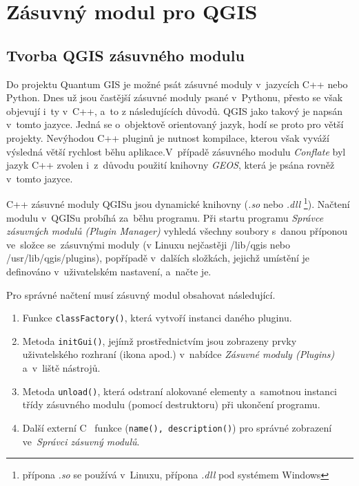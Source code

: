 \chapter{Zásuvný modul pro QGIS}
\label{6-plugin}

\section{Tvorba QGIS zásuvného modulu}
\label{plugin-tvorba}

Do projektu Quantum GIS je možné psát zásuvné moduly v~jazycích C++ nebo Python.
Dnes už jsou častější zásuvné moduly psané v~Pythonu, přesto se však objevují
i~ty v~C++, a~to z následujících důvodů. QGIS jako takový je napsán v~tomto 
jazyce. Jedná se o~objektově orientovaný jazyk, hodí se proto pro větší projekty. 
Nevýhodou C++ pluginů je nutnost kompilace, kterou však vyváží výsledná větší 
rychlost běhu aplikace.V~případě zásuvného modulu \textit{Conflate} byl jazyk 
C++ zvolen i~z~důvodu použití knihovny \textit{GEOS}, která je psána rovněž 
v~tomto jazyce.


C++ zásuvné moduly QGISu jsou dynamické knihovny (\textit{.so} nebo 
\textit{.dll} \footnote{ přípona \textit{.so} se používá v~Linuxu, přípona 
\textit{.dll} pod systémem Windows}). Načtení modulu v~QGISu probíhá za~běhu 
programu. Při startu programu \textit{Správce zásuvných modulů 
(Plugin Manager)} vyhledá všechny soubory s~danou příponou ve~složce 
se~zásuvnými moduly (v Linuxu nejčastěji /lib/qgis nebo 
/usr/lib/qgis/plugins), popřípadě v~dalších složkách, jejichž umístění
je definováno v~uživatelském nastavení, a~načte je.

Pro správné načtení musí zásuvný modul obsahovat následující.

\begin{enumerate}
 \item Funkce \texttt{classFactory()}, která vytvoří instanci daného pluginu.
 \item Metoda \texttt{initGui()}, jejímž prostřednictvím jsou zobrazeny prvky 
	uživatelského rozhraní (ikona apod.) v~nabídce \textit{Zásuvné moduly 
	(Plugins)} a~v~liště nástrojů.
 \item Metoda \texttt{unload()}, která odstraní alokované elementy a~samotnou
	instanci třídy zásuvného modulu (pomocí destruktoru) při ukončení 
	programu.
 \item Další externí C ~funkce (\texttt{na\-me(), descrip\-tion()}) pro správné
	zobrazení ve~\textit{Správci zásuvný modulů}.
\end{enumerate}

